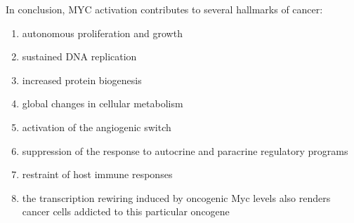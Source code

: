 In conclusion, MYC activation contributes to several hallmarks of cancer:
\begin{enumerate}
\item autonomous proliferation and growth
\item sustained DNA replication
\item increased protein biogenesis
\item global changes in cellular metabolism
\item activation of the angiogenic switch
\item suppression of the response to autocrine and paracrine regulatory programs
\item restraint of host immune responses
\item the transcription rewiring induced by oncogenic Myc levels also renders cancer cells addicted to this particular oncogene
\end{enumerate}
